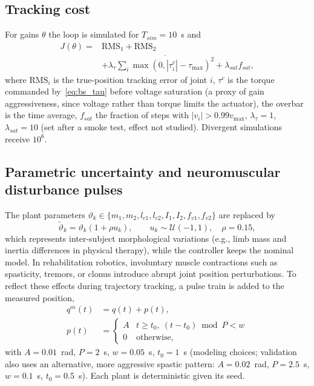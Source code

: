 \documentclass[10pt,journal,compsoc]{IEEEtran}
\begin{document}
\subsection{Tracking cost}
For gains $\theta$ the loop is simulated for $T_{sim}=10$~s and
\begin{equation}
\begin{aligned}
J(\theta)={}&\mathrm{RMS}_1+\mathrm{RMS}_2\\
&+\lambda_\tau\overline{\textstyle\sum_i\max(0,|\tau_i^c|-\tau_{\max})^2}+\lambda_{sat}f_{sat},
\end{aligned}
\label{eq:cost}
\end{equation}
where $\mathrm{RMS}_i$ is the true-position tracking error of joint $i$, $\tau^c$ is the torque commanded by~\eqref{eq:bs_tau} before voltage saturation (a proxy of gain aggressiveness, since voltage rather than torque limits the actuator), the overbar is the time average, $f_{sat}$ the fraction of steps with $|v_i|>0.99v_{\max}$, $\lambda_\tau=1$, $\lambda_{sat}=10$ (set after a smoke test, effect not studied). Divergent simulations receive $10^6$.

\subsection{Parametric uncertainty and neuromuscular disturbance pulses}
The plant parameters $\vartheta_k\in\{m_1,m_2,l_{c1},l_{c2},I_1,I_2,f_{v1},f_{v2}\}$ are replaced by
\begin{equation}
\tilde\vartheta_k=\vartheta_k(1+\rho u_k),\qquad u_k\sim\mathcal U(-1,1),\quad \rho=0.15,
\label{eq:uncertainty}
\end{equation}
which represents inter-subject morphological variations (e.g., limb mass and inertia differences in physical therapy), while the controller keeps the nominal model. In rehabilitation robotics, involuntary muscle contractions such as spasticity, tremors, or clonus introduce abrupt joint position perturbations. To reflect these effects during trajectory tracking, a pulse train is added to the measured position,
\begin{equation}
\begin{aligned}
q^m(t)&=q(t)+p(t),\\
p(t)&=\begin{cases}A & t\ge t_0,\ (t-t_0)\bmod P<w\\0&\text{otherwise},\end{cases}
\end{aligned}
\label{eq:pulse}
\end{equation}
with $A=0.01$~rad, $P=2$~s, $w=0.05$~s, $t_0=1$~s (modeling choices; validation also uses an alternative, more aggressive spastic pattern: $A=0.02$~rad, $P=2.5$~s, $w=0.1$~s, $t_0=0.5$~s). Each plant is deterministic given its seed.
\end{document}
